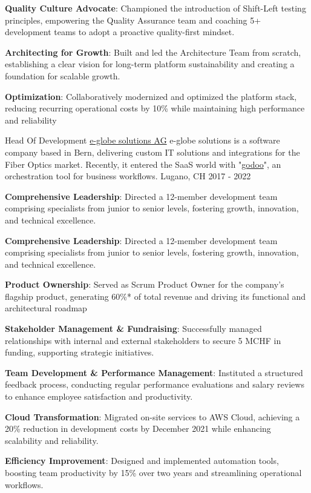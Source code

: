 \begin{cventries}
{\begin{cvitems}
        \item {\textbf{Quality Culture Advocate}: Championed the introduction of Shift-Left testing principles, empowering the Quality Assurance team and coaching 5+ development teams to adopt a proactive quality-first mindset.}
        \item {\textbf{Architecting for Growth}: Built and led the Architecture Team from scratch, establishing a clear vision for long-term platform sustainability and creating a foundation for scalable growth.}
        \item {\textbf{Optimization}: Collaboratively modernized and optimized the platform stack, reducing recurring operational costs by 10\% while maintaining high performance and reliability}
      \end{cvitems}
    }

	\cventry
	{Head Of Development} %
	{\href{https://www.e-globe-solutions.com}{e-globe solutions AG}} %
  {e-globe solutions is a software company based in Bern, delivering custom IT solutions and integrations for the Fiber Optics market. Recently, it entered the SaaS world with "\href{https://www.godoo.ch}{godoo}", an orchestration tool for business workflows.} %
	{Lugano, CH} %
	{2017 - 2022} %
	{
		\begin{cvitems} %
			\item {\textbf{Comprehensive Leadership}: Directed a 12-member development team comprising specialists from junior to senior levels, fostering growth, innovation, and technical excellence.}
			\item {\textbf{Comprehensive Leadership}: Directed a 12-member development team comprising specialists from junior to senior levels, fostering growth, innovation, and technical excellence.}
			\item {\textbf{Product Ownership}: Served as Scrum Product Owner for the company’s flagship product, generating 60\%* of total revenue and driving its functional and architectural roadmap}
			\item {\textbf{Stakeholder Management \& Fundraising}: Successfully managed relationships with internal and external stakeholders to secure 5 MCHF in funding, supporting strategic initiatives.}
			\item {\textbf{Team Development \& Performance Management}: Instituted a structured feedback process, conducting regular performance evaluations and salary reviews to enhance employee satisfaction and productivity.}
			\item {\textbf{Cloud Transformation}: Migrated on-site services to AWS Cloud, achieving a 20\% reduction in development costs by December 2021 while enhancing scalability and reliability.}
			\item {\textbf{Efficiency Improvement}: Designed and implemented automation tools, boosting team productivity by 15\% over two years and streamlining operational workflows.}
		\end{cvitems}
	}


\end{cventries}
